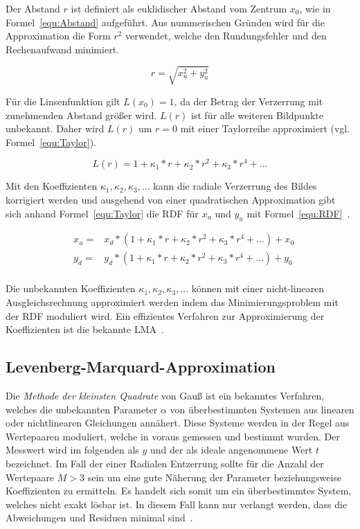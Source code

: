 Der Abstand $r$ ist definiert als euklidischer Abstand vom Zentrum $x_0$, wie in Formel~\ref{equ:Abstand} aufgeführt. Aus nummerischen Gründen wird für die Approximation die Form $r^2$ verwendet, welche den Rundungsfehler und den Rechenaufwand minimiert. 

\begin{equation}
\label{equ:Abstand}
r = \sqrt{x_u^2+y_u^2}
\end{equation}

 Für die Linsenfunktion gilt $L(x_0)=1$, da der Betrag der Verzerrung mit zunehmenden Abstand größer wird. $L(r)$ ist für alle weiteren Bildpunkte unbekannt. Daher wird $L(r)$ um $r=0$ mit einer Taylorreihe approximiert (vgl. Formel~\ref{equ:Taylor}). 
 
 \begin{equation}
 \label{equ:Taylor}
 L(r)=1+\kappa_1*r+\kappa_2*r^2+\kappa_3*r^4 + \dots
 \end{equation}

Mit den Koeffizienten $\kappa_1, \kappa_2, \kappa_3, \dots$ kann die radiale Verzerrung des Bildes korrigiert werden und ausgehend von einer quadratischen Approximation gibt sich anhand Formel~\ref{equ:Taylor} die RDF für $x_u$ und $y_u$ mit Formel~\ref{equ:RDF}~\cite{WangRaddist}.

\begin{equation}
\label{equ:RDF}
\begin{aligned}
&x_u = & x_d*(1+\kappa_1*r+\kappa_2*r^2+\kappa_3*r^4 + \dots) + x_0\\
&y_d = & y_d*(1+\kappa_1*r+\kappa_2*r^2+\kappa_3*r^4 + \dots) + y_0\\
\end{aligned}
\end{equation}

Die unbekannten Koeffizienten $\kappa_1, \kappa_2, \kappa_3, \dots$ können mit einer nicht-linearen Ausgleichsrechnung approximiert werden indem das Minimierungsproblem mit der RDF moduliert wird. Ein effizientes Verfahren zur Approximierung der Koeffizienten ist die bekannte LMA~\cite{LevMarquardt}.

\subsection{Levenberg-Marquard-Approximation}
Die \textit{Methode der kleinsten Quadrate} von Gauß ist ein bekanntes Verfahren, welches die unbekannten Parameter $\alpha$ von überbestimmten Systemen aus linearen oder nichtlinearen Gleichungen annähert. Diese Systeme werden in der Regel aus Wertepaaren moduliert, welche in voraus gemessen und bestimmt wurden. Der Messwert wird im folgenden als $y$ und der als ideale angenommene Wert $t$ bezeichnet.
Im Fall der einer Radialen Entzerrung sollte für die Anzahl der Wertepaare $M>3$ sein um eine gute Näherung der Parameter beziehungsweise Koeffizienten zu ermitteln.
Es handelt sich somit um ein überbestimmtes System, welches nicht exakt lösbar ist. In diesem Fall kann nur verlangt werden, dass die Abweichungen und Residuen minimal sind~\cite{schwarz2011numerische}. 

